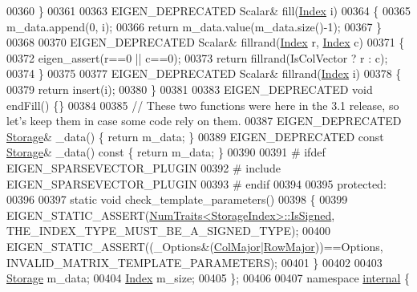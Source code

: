 \begin{DoxyCode}
00360     \}
00361 
00363     EIGEN\_DEPRECATED Scalar& fill(\hyperlink{group___core___module_a554f30542cc2316add4b1ea0a492ff02}{Index} i)
00364     \{
00365       m\_data.append(0, i);
00366       \textcolor{keywordflow}{return} m\_data.value(m\_data.size()-1);
00367     \}
00368 
00370     EIGEN\_DEPRECATED Scalar& fillrand(\hyperlink{group___core___module_a554f30542cc2316add4b1ea0a492ff02}{Index} r, \hyperlink{group___core___module_a554f30542cc2316add4b1ea0a492ff02}{Index} c)
00371     \{
00372       eigen\_assert(r==0 || c==0);
00373       \textcolor{keywordflow}{return} fillrand(IsColVector ? r : c);
00374     \}
00375 
00377     EIGEN\_DEPRECATED Scalar& fillrand(\hyperlink{group___core___module_a554f30542cc2316add4b1ea0a492ff02}{Index} i)
00378     \{
00379       \textcolor{keywordflow}{return} insert(i);
00380     \}
00381 
00383     EIGEN\_DEPRECATED \textcolor{keywordtype}{void} endFill() \{\}
00384     
00385     \textcolor{comment}{// These two functions were here in the 3.1 release, so let's keep them in case some code rely on them.}
00387 \textcolor{comment}{}    EIGEN\_DEPRECATED \hyperlink{class_eigen_1_1internal_1_1_compressed_storage}{Storage}& \_data() \{ \textcolor{keywordflow}{return} m\_data; \}
00389     EIGEN\_DEPRECATED \textcolor{keyword}{const} \hyperlink{class_eigen_1_1internal_1_1_compressed_storage}{Storage}& \_data()\textcolor{keyword}{ const }\{ \textcolor{keywordflow}{return} m\_data; \}
00390     
00391 \textcolor{preprocessor}{#   ifdef EIGEN\_SPARSEVECTOR\_PLUGIN}
00392 \textcolor{preprocessor}{#     include EIGEN\_SPARSEVECTOR\_PLUGIN}
00393 \textcolor{preprocessor}{#   endif}
00394 
00395 \textcolor{keyword}{protected}:
00396   
00397     \textcolor{keyword}{static} \textcolor{keywordtype}{void} check\_template\_parameters()
00398     \{
00399       EIGEN\_STATIC\_ASSERT(\hyperlink{group___core___module_struct_eigen_1_1_num_traits}{NumTraits<StorageIndex>::IsSigned},
      THE\_INDEX\_TYPE\_MUST\_BE\_A\_SIGNED\_TYPE);
00400       EIGEN\_STATIC\_ASSERT((\_Options&(\hyperlink{group__enums_ggaacded1a18ae58b0f554751f6cdf9eb13a0cbd4bdd0abcfc0224c5fcb5e4f6669a}{ColMajor}|\hyperlink{group__enums_ggaacded1a18ae58b0f554751f6cdf9eb13acfcde9cd8677c5f7caf6bd603666aae3}{RowMajor}))==Options,
      INVALID\_MATRIX\_TEMPLATE\_PARAMETERS);
00401     \}
00402     
00403     \hyperlink{class_eigen_1_1internal_1_1_compressed_storage}{Storage} m\_data;
00404     \hyperlink{group___core___module_a554f30542cc2316add4b1ea0a492ff02}{Index} m\_size;
00405 \};
00406 
00407 \textcolor{keyword}{namespace }\hyperlink{namespaceinternal}{internal} \{

\end{DoxyCode}

